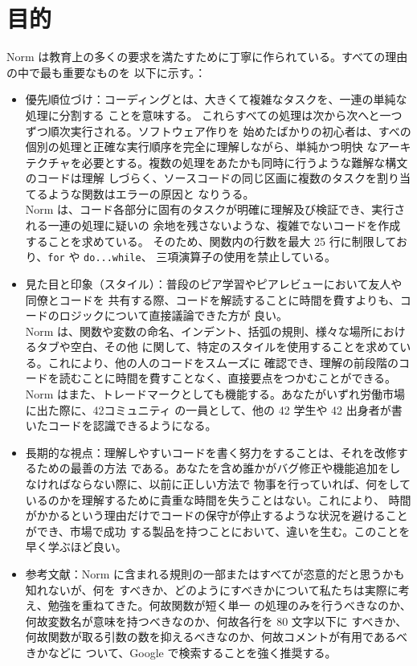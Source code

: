 \documentclass{42-ja}
\begin{document}
    \chapter{目的}

    Norm は教育上の多くの要求を満たすために丁寧に作られている。すべての理由の中で最も重要なものを
    以下に示す。：
    \begin{itemize}

    \item 優先順位づけ：コーディングとは、大きくて複雑なタスクを、一連の単純な処理に分割する
      ことを意味する。 これらすべての処理は次から次へと一つずつ順次実行される。ソフトウェア作りを
      始めたばかりの初心者は、すべの個別の処理と正確な実行順序を完全に理解しながら、単純かつ明快
      なアーキテクチャを必要とする。複数の処理をあたかも同時に行うような難解な構文のコードは理解
      しづらく、ソースコードの同じ区画に複数のタスクを割り当てるような関数はエラーの原因と
      なりうる。\\
      Norm は、コード各部分に固有のタスクが明確に理解及び検証でき、実行される一連の処理に疑いの
      余地を残さないような、複雑でないコードを作成することを求めている。
      そのため、関数内の行数を最大 25 行に制限しており、\texttt{for} や \texttt{do...while}、
      三項演算子の使用を禁止している。

    \item 見た目と印象（スタイル）：普段のピア学習やピアレビューにおいて友人や同僚とコードを
    共有する際、コードを解読することに時間を費すよりも、コードのロジックについて直接議論できた方が
    良い。\\
    Norm は、関数や変数の命名、インデント、括弧の規則、様々な場所におけるタブや空白、その他
    に関して、特定のスタイルを使用することを求めている。これにより、他の人のコードをスムーズに
    確認でき、理解の前段階のコードを読むことに時間を費すことなく、直接要点をつかむことができる。
    Norm はまた、トレードマークとしても機能する。あなたがいずれ労働市場に出た際に、42コミュニティ
    の一員として、他の 42 学生や 42 出身者が書いたコードを認識できるようになる。

    \item 長期的な視点：理解しやすいコードを書く努力をすることは、それを改修するための最善の方法
    である。あなたを含め誰かがバグ修正や機能追加をしなければならない際に、以前に正しい方法で
    物事を行っていれば、何をしているのかを理解するために貴重な時間を失うことはない。これにより、
    時間がかかるという理由だけでコードの保守が停止するような状況を避けることができ、市場で成功
    する製品を持つことにおいて、違いを生む。このことを早く学ぶほど良い。

    \item 参考文献：Norm に含まれる規則の一部またはすべてが恣意的だと思うかも知れないが、何を
    すべきか、どのようにすべきかについて私たちは実際に考え、勉強を重ねてきた。何故関数が短く単一
    の処理のみを行うべきなのか、何故変数名が意味を持つべきなのか、何故各行を 80 文字以下に
    すべきか、何故関数が取る引数の数を抑えるべきなのか、何故コメントが有用であるべきかなどに
    ついて、Google で検索することを強く推奨する。

    \end{itemize}
\end{document}
